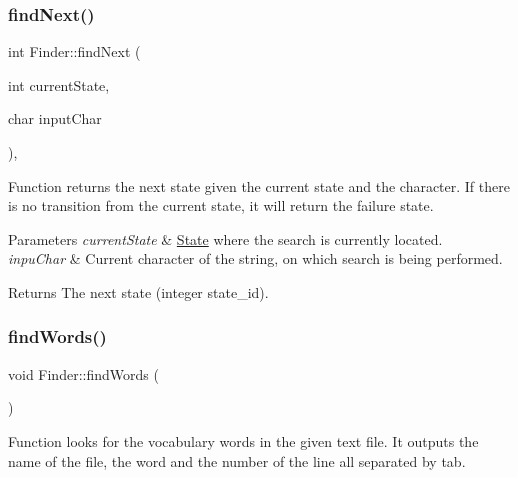 \subsubsection{\texorpdfstring{find\+Next()}{findNext()}}
{\footnotesize\ttfamily int Finder\+::find\+Next (\begin{DoxyParamCaption}\item[{int}]{current\+State,  }\item[{char}]{input\+Char }\end{DoxyParamCaption})\hspace{0.3cm}{\ttfamily [inline]}, {\ttfamily [private]}}

Function returns the next state given the current state and the character. If there is no transition from the current state, it will return the failure state.


\begin{DoxyParams}{Parameters}
{\em current\+State} & \hyperlink{structFinder_1_1State}{State} where the search is currently located. \\
\hline
{\em inpu\+Char} & Current character of the string, on which search is being performed. \\
\hline
\end{DoxyParams}
\begin{DoxyReturn}{Returns}
The next state (integer state\+\_\+id). 
\end{DoxyReturn}
\mbox{\label{classFinder_a5d406ff13d529df6d714e35effd0772f}} 
\subsubsection{\texorpdfstring{find\+Words()}{findWords()}}
{\footnotesize\ttfamily void Finder\+::find\+Words (\begin{DoxyParamCaption}{ }\end{DoxyParamCaption})\hspace{0.3cm}{\ttfamily [inline]}}

Function looks for the vocabulary words in the given text file. It outputs the name of the file, the word and the number of the line all separated by tab. \mbox{\label{classFinder_a1e517320c9df087be10d680f50d89a69}} 
